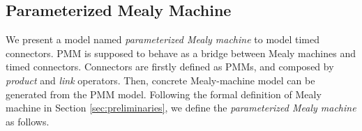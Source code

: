 \documentclass[conference, a4paper]{IEEEtran}
\begin{document}



\subsection{Parameterized Mealy Machine}
We present a model named \emph{parameterized Mealy machine} to model timed connectors. PMM is
supposed to behave as a bridge between Mealy machines and timed connectors. Connectors are firstly
defined as PMMs, and composed by \emph{product} and \emph{link} operators. Then, concrete
Mealy-machine model can be generated from the PMM model.
Following the formal definition of Mealy machine in Section \ref{sec:preliminaries}, we define the
\emph{parameterized Mealy machine} as follows. 
\end{document}
